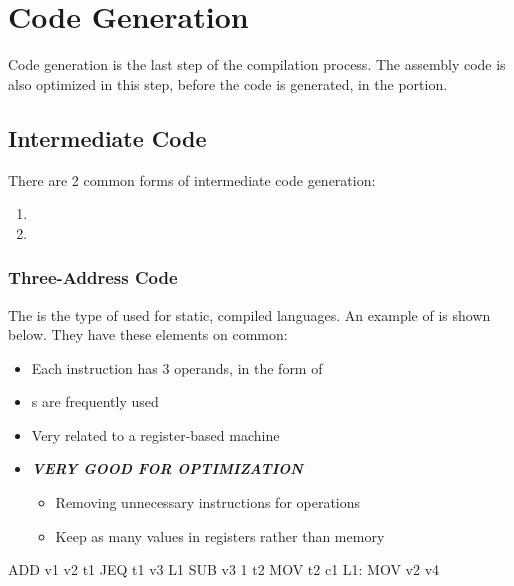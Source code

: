 \section{Code Generation}\label{sec:Code_Generation}
Code generation is the last step of the compilation process.
The assembly code is also optimized in this step, before the code is generated, in the  portion.

\subsection{Intermediate Code}\label{subsec:Intermediate_Code}
There are 2 common forms of intermediate code generation:
\begin{enumerate}[noitemsep]
\item {}
\item {}
\end{enumerate}

\subsubsection{Three-Address Code}\label{subsubsec:Three_Address_Code}
The  is the type of  used for static, compiled languages.
An example of  is shown below.
They have these elements on common:
\begin{itemize}[noitemsep]
\item Each instruction has 3 operands, in the form of 
\item {}s are frequently used
\item Very related to a register-based machine
\item \textbf{\emph{VERY GOOD FOR OPTIMIZATION}}
  \begin{itemize}[noitemsep]
  \item Removing unnecessary instructions for operations
  \item Keep as many values in registers rather than memory
  \end{itemize}
\end{itemize}

\begin{assemblysource}
    ADD v1 v2 t1
    JEQ t1 v3 L1
    SUB v3 1 t2
    MOV t2 c1
  L1:
    MOV v2 v4
\end{assemblysource}

